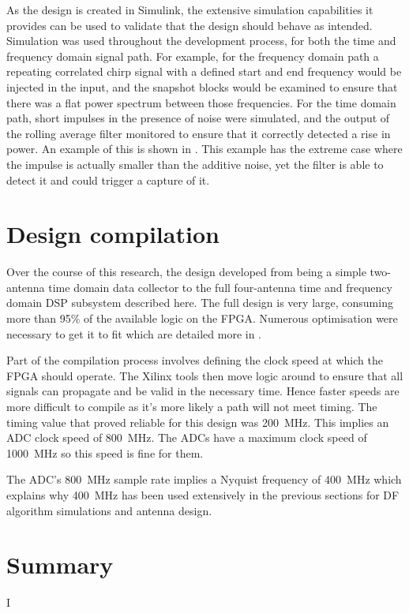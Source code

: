 As the design is created in Simulink, the extensive simulation capabilities it provides can be used to validate that the design should behave as intended. Simulation was used throughout the development process, for both the time and frequency domain signal path. For example, for the frequency domain path a repeating correlated chirp signal with a defined start and end frequency would be injected in the input, and the snapshot blocks would be examined to ensure that there was a flat power spectrum between those frequencies. For the time domain path, short impulses in the presence of noise were simulated, and the output of the rolling average filter monitored to ensure that it correctly detected a rise in power. An example of this is shown in . This example has the extreme case where the impulse is actually smaller than the additive noise, yet the filter is able to detect it and could trigger a capture of it.

\section{Design compilation}
Over the course of this research, the design developed from being a simple two-antenna time domain data collector to the full four-antenna time and frequency domain DSP subsystem described here. The full design is very large, consuming more than 95\% of the available logic on the FPGA. Numerous optimisation were necessary to get it to fit which are detailed more in .

Part of the compilation process involves defining the clock speed at which the FPGA should operate. The Xilinx tools then move logic around to ensure that all signals can propagate and be valid in the necessary time. Hence faster speeds are more difficult to compile as it's more likely a path will not meet timing. The timing value that proved reliable for this design was \SI{200}{\mega\hertz}. This implies an ADC clock speed of \SI{800}{\mega\hertz}. The ADCs have a maximum clock speed of \SI{1000}{\mega\hertz} so this speed is fine for them. 

The ADC's \SI{800}{\mega\hertz} sample rate implies a Nyquist frequency of \SI{400}{\mega\hertz} which explains why \SI{400}{\mega\hertz} has been used extensively in the previous sections for DF algorithm simulations and antenna design.



\section{Summary}
I
